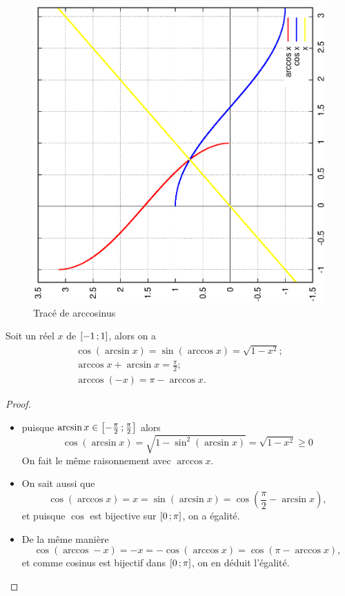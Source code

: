 %
\begin{figure}
  \centering
  \includegraphics[scale=0.4,angle=-90]{arccos.ps}
  \caption{Tracé de arccosinus}
  \label{fig:tracearccosinus}
\end{figure}
%
\begin{prop}
  Soit un réel $x$ de $\left[ -1 \, ;  1 \right]$, alors on a
  \begin{gather}
    \cos( \arcsin x)=\sin( \arccos x)=\sqrt{1-x^2}; \\
    \arccos x + \arcsin x = \frac{\pi}{2};\\
    \arccos(-x) = \pi - \arccos x.
  \end{gather}
\end{prop}
\begin{proof}
  \begin{itemize}
  \item puisque $\arcsin x \in \left[ -\frac{\pi}{2} \, ;  \frac{\pi}{2} \right]$ alors 
    \begin{equation}
      \cos( \arcsin x)=\sqrt{1- \sin^2(\arcsin x)}=\sqrt{1-x^2} \geq 0
    \end{equation}
    On fait le même raisonnement avec $\arccos x$.
  \item On sait aussi que 
    \begin{equation}
      \cos( \arccos x) = x = \sin( \arcsin x)=\cos \left( \frac{\pi}{2} - \arcsin x \right),
    \end{equation} 
    et puisque $\cos$ est bijective sur $\left[ 0 \, ;  \pi \right]$, on a égalité.
  \item De la même manière 
    \begin{equation}
      \cos( \arccos -x)=-x=-\cos( \arccos x)=\cos(\pi - \arccos x),
    \end{equation} 
    et comme cosinus est bijectif dans $\left[ 0 \, ;  \pi \right]$, on en déduit l'égalité.
  \end{itemize}
\end{proof}
%
